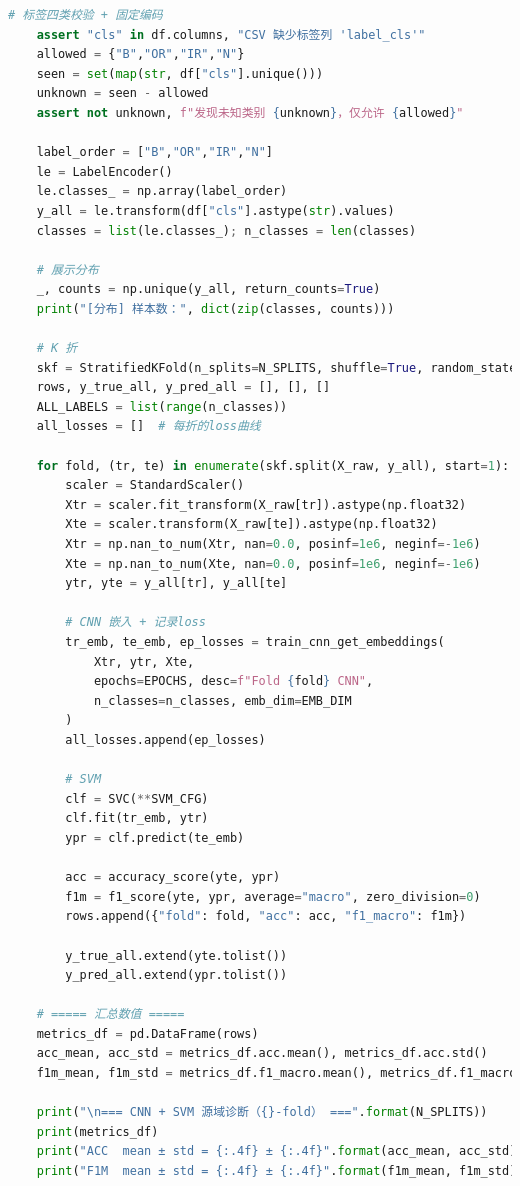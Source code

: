 \documentclass[a4paper]{CPIPC}
\numberwithin{equation}{section}
\begin{document}
\begin{lstlisting}[language=Python, caption=CNN + SVM Classifier]
    # 标签四类校验 + 固定编码
    assert "cls" in df.columns, "CSV 缺少标签列 'label_cls'"
    allowed = {"B","OR","IR","N"}
    seen = set(map(str, df["cls"].unique()))
    unknown = seen - allowed
    assert not unknown, f"发现未知类别 {unknown}，仅允许 {allowed}"

    label_order = ["B","OR","IR","N"]
    le = LabelEncoder()
    le.classes_ = np.array(label_order)
    y_all = le.transform(df["cls"].astype(str).values)
    classes = list(le.classes_); n_classes = len(classes)

    # 展示分布
    _, counts = np.unique(y_all, return_counts=True)
    print("[分布] 样本数：", dict(zip(classes, counts)))

    # K 折
    skf = StratifiedKFold(n_splits=N_SPLITS, shuffle=True, random_state=SEED)
    rows, y_true_all, y_pred_all = [], [], []
    ALL_LABELS = list(range(n_classes))
    all_losses = []  # 每折的loss曲线

    for fold, (tr, te) in enumerate(skf.split(X_raw, y_all), start=1):
        scaler = StandardScaler()
        Xtr = scaler.fit_transform(X_raw[tr]).astype(np.float32)
        Xte = scaler.transform(X_raw[te]).astype(np.float32)
        Xtr = np.nan_to_num(Xtr, nan=0.0, posinf=1e6, neginf=-1e6)
        Xte = np.nan_to_num(Xte, nan=0.0, posinf=1e6, neginf=-1e6)
        ytr, yte = y_all[tr], y_all[te]

        # CNN 嵌入 + 记录loss
        tr_emb, te_emb, ep_losses = train_cnn_get_embeddings(
            Xtr, ytr, Xte,
            epochs=EPOCHS, desc=f"Fold {fold} CNN",
            n_classes=n_classes, emb_dim=EMB_DIM
        )
        all_losses.append(ep_losses)

        # SVM
        clf = SVC(**SVM_CFG)
        clf.fit(tr_emb, ytr)
        ypr = clf.predict(te_emb)

        acc = accuracy_score(yte, ypr)
        f1m = f1_score(yte, ypr, average="macro", zero_division=0)
        rows.append({"fold": fold, "acc": acc, "f1_macro": f1m})

        y_true_all.extend(yte.tolist())
        y_pred_all.extend(ypr.tolist())

    # ===== 汇总数值 =====
    metrics_df = pd.DataFrame(rows)
    acc_mean, acc_std = metrics_df.acc.mean(), metrics_df.acc.std()
    f1m_mean, f1m_std = metrics_df.f1_macro.mean(), metrics_df.f1_macro.std()

    print("\n=== CNN + SVM 源域诊断（{}-fold） ===".format(N_SPLITS))
    print(metrics_df)
    print("ACC  mean ± std = {:.4f} ± {:.4f}".format(acc_mean, acc_std))
    print("F1M  mean ± std = {:.4f} ± {:.4f}".format(f1m_mean, f1m_std))


\end{lstlisting}
\end{document}
